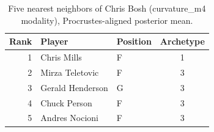 \begin{table}[htbp]
  \centering\small
  \begin{tabular}{rllc}
    \toprule
    Rank & Player & Position & Archetype \\
    \midrule
    1 & Chris Mills & F & 1 \\
    2 & Mirza Teletovic & F & 3 \\
    3 & Gerald Henderson & G & 3 \\
    4 & Chuck Person & F & 3 \\
    5 & Andres Nocioni & F & 3 \\
    \bottomrule
  \end{tabular}
  \caption{Five nearest neighbors of Chris Bosh (curvature_m4 modality), Procrustes-aligned posterior mean.}
  \label{tab:Chris_Bosh_neighbors_curvature_m4}
\end{table}

